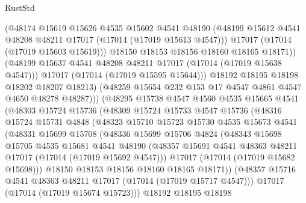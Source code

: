 \begin{lexlean}{RustStd}
\begin{coremodule}
{\begin{coremodule}
{{{{{{{{{{{{{{{{{{{{{{{{{{{{{{{{{{{{{{{{{{{{{{{{{{{{{{{                      (@48174
                        @15619
                        @15626
                        @4535
                        @15602
                        @4541
                        @48190
                        (@48199 @15612 @4541 @48208 @48211 @17017 (@17014 (@17019 @15613 @4547)))
                        @17017
                        (@17014 (@17019 @15603 @15619)))
                      @18150
                      @18153
                      @18156
                      @18160
                      @18165
                      @18171))
                  (@48199 @15637 @4541 @48208 @48211 @17017 (@17014 (@17019 @15638 @4547)))
                  @17017
                  (@17014 (@17019 @15595 @15644)))
                @18192
                @18195
                @18198
                @18202
                @18207
                @18213)
              (@48259 @15654 @232 @153 @17 @4547 @4861 @4547 @4650 @48278 @48287)))
          (@48295
            @15738
            @4547
            @4560
            @4535
            @15665
            @4541
            (@48303
              @15724
              @15736
              (@48309
                @15724
                @15733
                @4547
                @15736
                (@48316
                  @15724
                  @15731
                  @4848
                  (@48323
                    @15710
                    @15723
                    @15730
                    @4535
                    @15673
                    @4541
                    (@48331
                      @15699
                      @15708
                      (@48336
                        @15699
                        @15706
                        @4824
                        (@48343
                          @15698
                          @15705
                          @4535
                          @15681
                          @4541
                          @48190
                          (@48357 @15691 @4541 @48363 @48211 @17017 (@17014 (@17019 @15692 @4547)))
                          @17017
                          (@17014 (@17019 @15682 @15698)))
                        @18150
                        @18153
                        @18156
                        @18160
                        @18165
                        @18171))
                    (@48357 @15716 @4541 @48363 @48211 @17017 (@17014 (@17019 @15717 @4547)))
                    @17017
                    (@17014 (@17019 @15674 @15723)))
                  @18192
                  @18195
                  @18198
}}}}}}}}}}}}}}}}}}}}}}}}}}}}}}}}}}}}}}}}}}}}}}}}}}}}}}}
\end{coremodule}}
\end{coremodule}
\end{lexlean}
